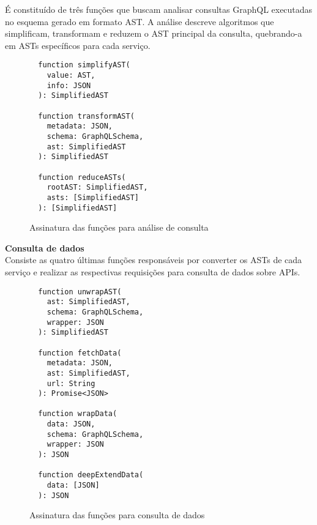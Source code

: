 É constituído de três funções que buscam analisar consultas GraphQL executadas no esquema gerado em formato AST. A análise descreve algoritmos que simplificam, transformam e reduzem o AST principal da consulta, quebrando-a em ASTs específicos para cada serviço.

\begin{figure}[H]
  \centering
  \begin{verbatim}
  function simplifyAST(
    value: AST,
    info: JSON
  ): SimplifiedAST

  function transformAST(
    metadata: JSON,
    schema: GraphQLSchema,
    ast: SimplifiedAST
  ): SimplifiedAST

  function reduceASTs(
    rootAST: SimplifiedAST,
    asts: [SimplifiedAST]
  ): [SimplifiedAST]
  \end{verbatim}
  \caption{Assinatura das funções para análise de consulta}
\end{figure}

\textbf{Consulta de dados} \\

Consiste as quatro últimas funções responsáveis por converter os ASTs de cada serviço e realizar as respectivas requisições para consulta de dados sobre APIs.

\begin{figure}[H]
  \centering
  \begin{verbatim}
  function unwrapAST(
    ast: SimplifiedAST,
    schema: GraphQLSchema,
    wrapper: JSON
  ): SimplifiedAST

  function fetchData(
    metadata: JSON,
    ast: SimplifiedAST,
    url: String
  ): Promise<JSON>

  function wrapData(
    data: JSON,
    schema: GraphQLSchema,
    wrapper: JSON
  ): JSON

  function deepExtendData(
    data: [JSON]
  ): JSON
  \end{verbatim}
  \caption{Assinatura das funções para consulta de dados}
\end{figure}
